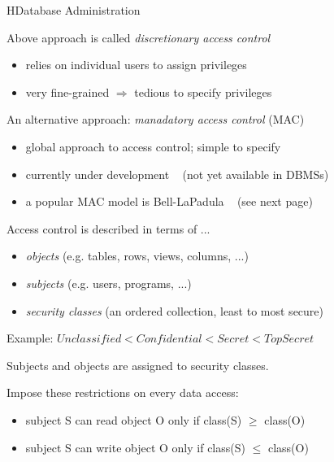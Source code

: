 \begin{lecture}{H}{Database Administration}
\begin{slide}
Above approach is called {\em{discretionary access control}}
\begin{itemize}
\item relies on individual users to assign privileges
\item very fine-grained $\Rightarrow$ tedious to specify privileges
\end{itemize}
An alternative approach: {\em{manadatory access control}} {\small (MAC)}
\begin{itemize}
\item global approach to access control; simple to specify
\item currently under development ~ {\small (not yet available in DBMSs)}
\item a popular MAC model is Bell-LaPadula
	~ {\small (see next page)}
\end{itemize}
\end{slide}

\begin{slide}
Access control is described in terms of ...
\begin{itemize}
\item {\em{objects}}
	{\small (e.g. tables, rows, views, columns, ...)}
\item {\em{subjects}}
	{\small (e.g. users, programs, ...)}
\item {\em{security classes}}
	{\small (an ordered collection, least to most secure)}
\end{itemize}
Example: $Unclassified < Confidential < Secret < Top Secret$

Subjects and objects are assigned to security classes.

Impose these restrictions on every data access:
\begin{itemize}
\item subject S can read object O only if class(S) $\geq$ class(O)
\item subject S can write object O only if class(S) $\leq$ class(O)
\end{itemize}
\end{slide}


\end{lecture}
